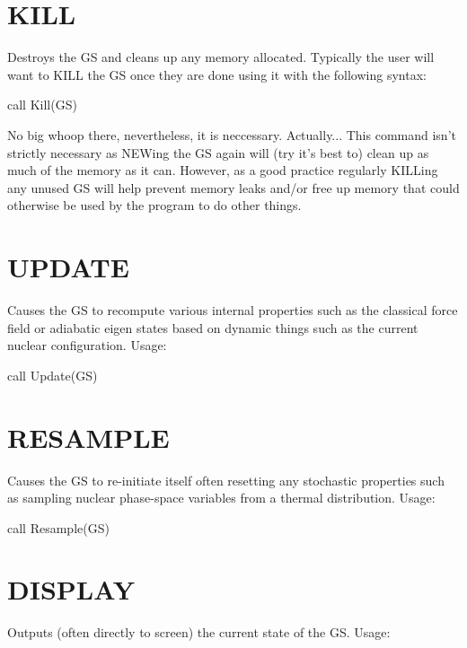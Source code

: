  \hypertarget{_interface_KILL}{}\section{K\-I\-L\-L}\label{_interface_KILL}
Destroys the G\-S and cleans up any memory allocated. Typically the user will want to K\-I\-L\-L the G\-S once they are done using it with the following syntax\-:\par
 \par
 call Kill(\-G\-S)\par
 \par
 No big whoop there, nevertheless, it is neccessary. Actually... This command isn't strictly necessary as N\-E\-Wing the G\-S again will (try it's best to) clean up as much of the memory as it can. However, as a good practice regularly K\-I\-L\-Ling any unused G\-S will help prevent memory leaks and/or free up memory that could otherwise be used by the program to do other things.\par
 \hypertarget{_interface_UPDATE}{}\section{U\-P\-D\-A\-T\-E}\label{_interface_UPDATE}
Causes the G\-S to recompute various internal properties such as the classical force field or adiabatic eigen states based on dynamic things such as the current nuclear configuration. Usage\-:\par
 \par
 call Update(\-G\-S) \par
 \hypertarget{_interface_RESAMPLE}{}\section{R\-E\-S\-A\-M\-P\-L\-E}\label{_interface_RESAMPLE}
Causes the G\-S to re-\/initiate itself often resetting any stochastic properties such as sampling nuclear phase-\/space variables from a thermal distribution. Usage\-:\par
 \par
 call Resample(\-G\-S)\par
 \hypertarget{_interface_DISPLAY}{}\section{D\-I\-S\-P\-L\-A\-Y}\label{_interface_DISPLAY}
Outputs (often directly to screen) the current state of the G\-S. Usage\-:\par
 \par

